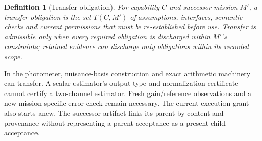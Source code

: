\documentclass[11pt]{article}
\newtheorem{definition}{Definition}
\begin{document}
\begin{definition}[Transfer obligation]
For capability $C$ and successor mission $M'$, a transfer obligation is the set $T(C,M')$ of assumptions, interfaces, semantic checks and current permissions that must be re-established before use. Transfer is admissible only when every required obligation is discharged within $M'$'s constraints; retained evidence can discharge only obligations within its recorded scope.
\end{definition}

In the photometer, nuisance-basis construction and exact arithmetic machinery can transfer. A scalar estimator's output type and normalization certificate cannot certify a two-channel estimator. Fresh gain/reference observations and a new mission-specific error check remain necessary. The current execution grant also starts anew. The successor artifact links its parent by content and provenance without representing a parent acceptance as a present child acceptance.
\end{document}
